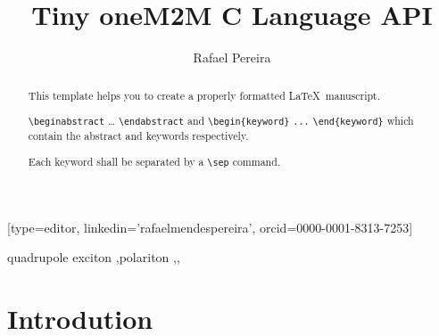 \documentclass[a4paper,fleqn]{cas-dc}
\begin{document}
\let\WriteBookmarks\relax
\def\floatpagepagefraction{1}
\def\textpagefraction{.001}

\title [mode = title]{Tiny oneM2M C Language API}                     


\author[1]{Rafael Pereira}[type=editor,
                        linkedin='rafaelmendespereira',
                        orcid=0000-0001-8313-7253]
   
\address[1]{Computer Science and Communications Research Centre, School of Technology and Management, Polytechnic of Leiria, 2411-901 Leiria, Portugal}

\begin{abstract}
This template helps you to create a properly formatted \LaTeX\ manuscript.

\noindent\texttt{\textbackslash begin{abstract}} \dots 
\texttt{\textbackslash end{abstract}} and
\verb+\begin{keyword}+ \verb+...+ \verb+\end{keyword}+ 
which
contain the abstract and keywords respectively. 

\noindent Each keyword shall be separated by a \verb+\sep+ command.
\end{abstract}

%

\begin{keywords}
quadrupole exciton \sep polariton \sep \WGM \sep \BEC
\end{keywords}


\maketitle

\section{Introdution}
\end{document}
